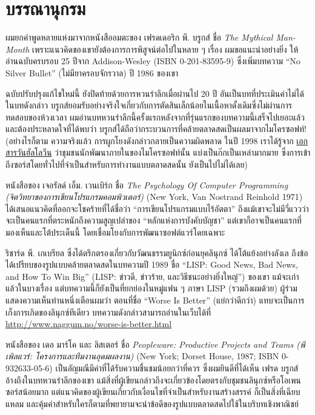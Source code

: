 \chapter{บรรณานุกรม}

ผมยกคำพูดหลายแห่งมาจากหนังสืออมตะของ เฟรดเดอริก พี. บรูกส์ ชื่อ
\emph{The Mythical Man-Month}
เพราะแนวคิดของเขายังต้องการการพิสูจน์ต่อไปในหลาย ๆ  เรื่อง
ผมขอแนะนำอย่างยิ่ง ให้อ่านฉบับครบรอบ 25 ปีจาก Addison-Wesley (ISBN
0-201-83595-9) ซึ่งเพิ่มบทความ ``No Silver Bullet'' (ไม่มียาครอบจักรวาล)
ปี 1986 ของเขา

\noindent ฉบับปรับปรุงแก้ไขใหม่นี้ ยังปิดท้ายด้วยการหวนรำลึกเมื่อผ่านไป 20 ปี
อันเป็นบทที่ประเมินค่าไม่ได้ ในบทดังกล่าว
บรูกส์ยอมรับอย่างจริงใจเกี่ยวกับการตัดสินเล็กน้อยในเนื้อหาดั้งเดิมซึ่งไม่ผ่านการทดสอบของห้วงเวลา
ผมอ่านบทหวนรำลึกนี้ครั้งแรกหลังจากที่รุ่นแรกของบทความนี้เสร็จไปเยอะแล้ว
และต้องประหลาดใจที่ได้พบว่า
บรูกส์ได้ถือว่ากระบวนการที่คล้ายตลาดสดเป็นผลมาจากไมโครซอฟท์!
(อย่างไรก็ตาม ความจริงแล้ว การผูกโยงดังกล่าวกลายเป็นความผิดพลาด ในปี
1998 เราได้รู้จาก
\href{http://www.opensource.org/halloween/}{เอกสารวันฮัลโลวีน}
ว่าชุมชนนักพัฒนาภายในของไมโครซอฟท์นั้น แบ่งเป็นก๊กเป็นเหล่ามากมาย
ซึ่งการเข้าถึงซอร์สโดยทั่วไปที่จำเป็นสำหรับการทำงานแบบตลาดสดนั้น
ยังเป็นไปไม่ได้เลย)

\noindent  หนังสือของ เจอรัลด์ เอ็ม. เวนเบิร์ก ชื่อ \emph{The Psychology Of
  Computer Programming (จิตวิทยาของการเขียนโปรแกรมคอมพิวเตอร์)} (New York,
Van Nostrand Reinhold 1971) ได้เสนอแนวคิดที่ออกจะโชคร้ายที่ได้ชื่อว่า
``การเขียนโปรแกรมแบบไร้อัตตา''
ถึงแม้เขาจะไม่มีวี่แววว่าจะเป็นคนแรกที่ตระหนักถึงความสูญเปล่าของ
``หลักแห่งการบังคับบัญชา''
แต่เขาก็อาจเป็นคนแรกที่มองเห็นและโต้ประเด็นนี้
โดยเชื่อมโยงกับการพัฒนาซอฟต์แวร์โดยเฉพาะ

\noindent  ริชาร์ด พี. เกเบรียล
ซึ่งได้ตรึกตรองเกี่ยวกับวัฒนธรรมยูนิกซ์ก่อนยุคลินุกซ์
ได้โต้แย้งอย่างลังเล ถึงข้อได้เปรียบของรูปแบบคล้ายตลาดสดในบทความปี 1989
ชื่อ ``LISP: Good News, Bad News, and How To Win Big'' (LISP: ข่าวดี,
ข่าวร้าย, และวิธีชนะอย่างยิ่งใหญ่'') ของเขา แม้จะเก่าแล้วในบางเรื่อง
แต่บทความนี้ก็ยังเป็นที่ยกย่องในหมู่แฟน ๆ  ภาษา LISP (รวมถึงผมด้วย)
ผู้ร่วมแสดงความเห็นท่านหนึ่งเตือนผมว่า ตอนที่ชื่อ ``Worse Is Better''
(แย่กว่าดีกว่า) แทบจะเป็นการเก็งการเกิดของลินุกซ์ทีเดียว
บทความดังกล่าวสามารถอ่านในเว็บได้ที่
\url{http://www.naggum.no/worse-is-better.html}

\noindent  หนังสือของ เดอ มาร์โค และ ลิสเตอร์ ชื่อ \emph{Peopleware: Productive
  Projects and Teams (พีเพิลแวร์: โครงการและทีมงานอุดมผลงาน)} (New York;
Dorset House, 1987; ISBN 0-932633-05-6)
เป็นอัญมณีมีค่าที่ได้รับความชื่นชมน้อยกว่าที่ควร ซึ่งผมยินดีที่ได้เห็น
เฟรด บรูกส์ อ้างถึงในบทหวนรำลึกของเขา
แม้สิ่งที่ผู้เขียนกล่าวถึงจะเกี่ยวข้องโดยตรงกับชุมชนลินุกซ์หรือโอเพนซอร์สน้อยมาก
แต่แนวคิดของผู้เขียนเกี่ยวกับเงื่อนไขที่จำเป็นสำหรับงานสร้างสรรค์
ก็เป็นสิ่งที่เฉียบแหลม
และคุ้มค่าสำหรับใครก็ตามที่พยายามจะนำข้อดีของรูปแบบตลาดสดไปใช้ในบริบทเชิงพาณิชย์

